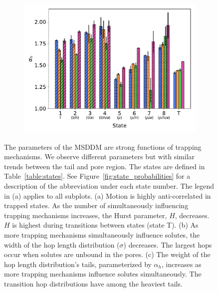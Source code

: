 \documentclass[aps,pre,preprint,groupedaddress]{revtex4-2}
\begin{document}
\begin{figure}
\begin{subfigure}{0.325\textwidth}
  \includegraphics[width=\textwidth]{alpha_v_state.pdf}
  \caption{}\label{fig:alpha_v_state}
  \end{subfigure}
  \caption{The parameters of the MSDDM are strong functions of trapping mechanisms.
  We observe different parameters but with similar trends between the tail and pore
  region. The states are defined in Table~\ref{table:states}. See Figure~\ref{fig:state_probabilities}
  for a description of the abbreviation under each state number. The legend in (a) applies to all subplots. (a) Motion is
  highly anti-correlated in trapped states. As the number of simultaneously influencing
  trapping mechanisms increases, the Hurst parameter, $H$, decreases. $H$ is
  highest during transitions between states (state T). (b) As more trapping mechanisms
  simultaneously influence solutes, the width of the hop length distribution ($\sigma$) decreases.
  The largest hops occur when solutes are unbound in the pores. (c) The weight of the 
  hop length distribution's tails, parameterized by $\alpha_h$, increases as more trapping
  mechanisms influence solutes simultaneously. The transition hop distributions have
  among the heaviest tails.}\label{fig:msddm_parameters}
  \end{figure}
\end{document}
